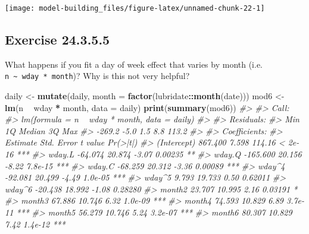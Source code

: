 \documentclass[]{book}
\newenvironment{Shaded}{\begin{snugshade}}{\end{snugshade}}
\newcommand{\CommentTok}[1]{\textcolor[rgb]{0.56,0.35,0.01}{\textit{#1}}}
\newcommand{\DataTypeTok}[1]{\textcolor[rgb]{0.13,0.29,0.53}{#1}}
\newcommand{\KeywordTok}[1]{\textcolor[rgb]{0.13,0.29,0.53}{\textbf{#1}}}
\newcommand{\NormalTok}[1]{#1}
\newcommand{\OperatorTok}[1]{\textcolor[rgb]{0.81,0.36,0.00}{\textbf{#1}}}
\newcommand{\StringTok}[1]{\textcolor[rgb]{0.31,0.60,0.02}{#1}}
\theoremstyle{plain}
\theoremstyle{remark}
\begin{document}
\begin{center}\texttt{[image: model-building\_files/figure-latex/unnamed-chunk-22-1]} \end{center}

\hypertarget{exercise-24.3.5.5}{%
\subsection*{\texorpdfstring{Exercise {24.3.5.5}}{Exercise 24.3.5.5}}\label{exercise-24.3.5.5}}

What happens if you fit a day of week effect that varies by month (i.e. \texttt{n\ \textasciitilde{}\ wday\ *\ month})? Why is this not very helpful?

\begin{Shaded}
\begin{Highlighting}[]
\NormalTok{daily <-}\StringTok{ }\KeywordTok{mutate}\NormalTok{(daily, }\DataTypeTok{month =} \KeywordTok{factor}\NormalTok{(lubridate}\OperatorTok{::}\KeywordTok{month}\NormalTok{(date)))}
\NormalTok{mod6 <-}\StringTok{ }\KeywordTok{lm}\NormalTok{(n }\OperatorTok{~}\StringTok{ }\NormalTok{wday }\OperatorTok{*}\StringTok{ }\NormalTok{month, }\DataTypeTok{data =}\NormalTok{ daily)}
\KeywordTok{print}\NormalTok{(}\KeywordTok{summary}\NormalTok{(mod6))}
\CommentTok{#> }
\CommentTok{#> Call:}
\CommentTok{#> lm(formula = n ~ wday * month, data = daily)}
\CommentTok{#> }
\CommentTok{#> Residuals:}
\CommentTok{#>    Min     1Q Median     3Q    Max }
\CommentTok{#> -269.2   -5.0    1.5    8.8  113.2 }
\CommentTok{#> }
\CommentTok{#> Coefficients:}
\CommentTok{#>                Estimate Std. Error t value Pr(>|t|)    }
\CommentTok{#> (Intercept)     867.400      7.598  114.16  < 2e-16 ***}
\CommentTok{#> wday.L          -64.074     20.874   -3.07  0.00235 ** }
\CommentTok{#> wday.Q         -165.600     20.156   -8.22  7.8e-15 ***}
\CommentTok{#> wday.C          -68.259     20.312   -3.36  0.00089 ***}
\CommentTok{#> wday^4          -92.081     20.499   -4.49  1.0e-05 ***}
\CommentTok{#> wday^5            9.793     19.733    0.50  0.62011    }
\CommentTok{#> wday^6          -20.438     18.992   -1.08  0.28280    }
\CommentTok{#> month2           23.707     10.995    2.16  0.03191 *  }
\CommentTok{#> month3           67.886     10.746    6.32  1.0e-09 ***}
\CommentTok{#> month4           74.593     10.829    6.89  3.7e-11 ***}
\CommentTok{#> month5           56.279     10.746    5.24  3.2e-07 ***}
\CommentTok{#> month6           80.307     10.829    7.42  1.4e-12 ***}

\end{Highlighting}
\end{Shaded}
\end{document}
